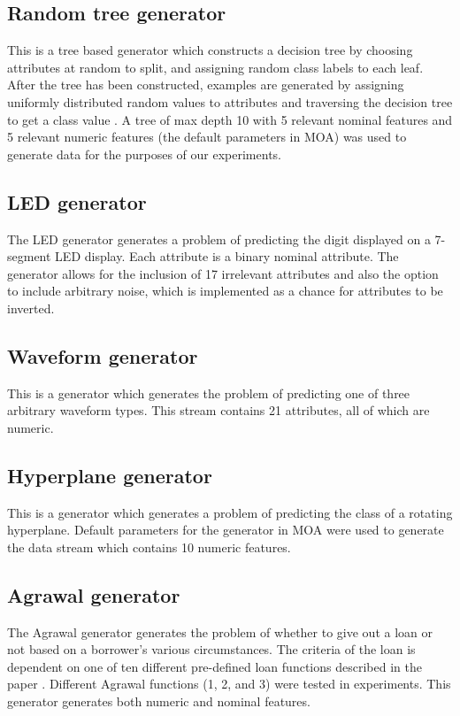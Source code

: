 \subsection{Random tree generator}
This is a tree based generator which constructs a decision tree by choosing attributes at random to split, and assigning random class labels to each leaf. After the tree has been constructed, examples are generated by assigning uniformly distributed random values to attributes and traversing the decision tree to get a class value \citep{Domingos:2000:MHD:347090.347107}. A tree of max depth 10 with 5 relevant nominal features and 5 relevant numeric features (the default parameters in MOA) was used to generate data for the purposes of our experiments.

\subsection{LED generator}
The LED generator generates a problem of predicting the digit displayed on a 7-segment LED display. Each attribute is a binary nominal attribute. The generator allows for the inclusion of 17 irrelevant attributes and also the option to include arbitrary noise, which is implemented as a chance for attributes to be inverted.

\subsection{Waveform generator}
This is a generator which generates the problem of predicting one of three arbitrary waveform types. This stream contains 21 attributes, all of which are numeric.

\subsection{Hyperplane generator}
This is a generator which generates a problem of predicting the class of a rotating hyperplane. Default parameters for the generator in MOA were used to generate the data stream which contains 10 numeric features.

\subsection{Agrawal generator}
The Agrawal generator generates the problem of whether to give out a loan or not based on a borrower's various circumstances. The criteria of the loan is dependent on one of ten different pre-defined loan functions described in the paper \citet{Agrawal1993}. Different Agrawal functions (1, 2, and 3) were tested in experiments. This generator generates both numeric and nominal features.

